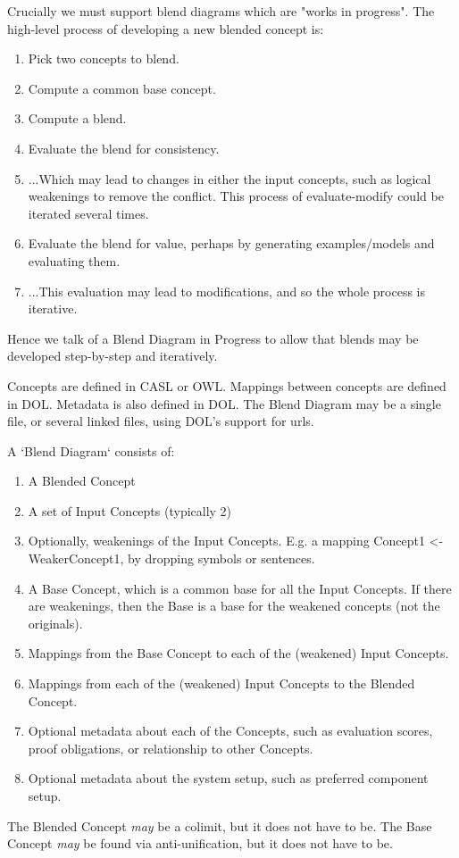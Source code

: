 Crucially we must support blend diagrams which are "works in progress". The high-level process of developing a new blended concept is:
\begin{enumerate}
\item Pick two concepts to blend.
\item Compute a common base concept.
\item Compute a blend.
\item Evaluate the blend for consistency.
\item ...Which may lead to changes in either the input concepts, such as logical weakenings to remove the conflict. This process of evaluate-modify could be iterated several times.
\item Evaluate the blend for value, perhaps by generating examples/models and evaluating them.
\item ...This evaluation may lead to modifications, and so the whole process is iterative.
\end{enumerate}
Hence we talk of a Blend Diagram in Progress to allow that blends may be developed step-by-step and iteratively.

Concepts are defined in CASL or OWL. Mappings between concepts are defined in DOL. Metadata is also defined in DOL. The Blend Diagram may be a single file, or several linked files, using DOL's support for urls.

A `Blend Diagram` consists of:
\begin{enumerate}
\item A Blended Concept
\item A set of Input Concepts (typically 2)
\item Optionally, weakenings of the Input Concepts. E.g. a mapping Concept1 <- WeakerConcept1, by dropping symbols or sentences.
\item A Base Concept, which is a common base for all the Input Concepts. If there are weakenings, then the Base is a base for the weakened concepts (not the originals).
\item Mappings from the Base Concept to each of the (weakened) Input Concepts.
\item Mappings from each of the (weakened) Input Concepts to the Blended Concept.
\item Optional metadata about each of the Concepts, such as evaluation scores,  proof obligations, or relationship to other Concepts.
\item Optional metadata about the system setup, such as preferred component setup.
\end{enumerate}
The Blended Concept {\em may} be a colimit, but it does not have to be.
The Base Concept {\em may} be found via anti-unification, but it does not have to be.


